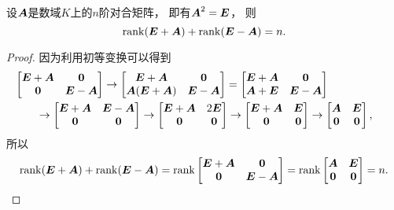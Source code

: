 \begin{example}\label{example:对合矩阵.对合矩阵的秩的性质1}
设\(\boldsymbol{A}\)是数域\(K\)上的\(n\)阶对合矩阵，
即有\(\boldsymbol{A}^2=\boldsymbol{E}\)，
则\[
	\rank(\boldsymbol{E}+\boldsymbol{A})+\rank(\boldsymbol{E}-\boldsymbol{A})=n.
\]
\begin{proof}
因为利用初等变换可以得到\begin{align*}
	&\hspace{-20pt}
	\begin{bmatrix}
		\vb{E}+\vb{A} & \vb0 \\
		\vb0 & \vb{E}-\vb{A}
	\end{bmatrix}
	\to \begin{bmatrix}
		\vb{E}+\vb{A} & \vb0 \\
		\vb{A}(\vb{E}+\vb{A}) & \vb{E}-\vb{A}
	\end{bmatrix}
	= \begin{bmatrix}
		\vb{E}+\vb{A} & \vb0 \\
		\vb{A}+\vb{E} & \vb{E}-\vb{A}
	\end{bmatrix} \\
	&\to \begin{bmatrix}
		\vb{E}+\vb{A} & \vb{E}-\vb{A} \\
		\vb0 & \vb0
	\end{bmatrix}
	\to \begin{bmatrix}
		\vb{E}+\vb{A} & 2\vb{E} \\
		\vb0 & \vb0
	\end{bmatrix}
	\to \begin{bmatrix}
		\vb{E}+\vb{A} & \vb{E} \\
		\vb0 & \vb0
	\end{bmatrix}
	\to \begin{bmatrix}
		\vb{A} & \vb{E} \\
		\vb0 & \vb0
	\end{bmatrix},
\end{align*}
所以\[
	\rank(\boldsymbol{E}+\boldsymbol{A})+\rank(\boldsymbol{E}-\boldsymbol{A})
	=\rank\begin{bmatrix}
		\boldsymbol{E}+\boldsymbol{A} & \boldsymbol0 \\
		\boldsymbol0 & \boldsymbol{E}-\boldsymbol{A}
	\end{bmatrix}
	= \rank\begin{bmatrix}
		\boldsymbol{A} & \boldsymbol{E} \\
		\boldsymbol0 & \boldsymbol0
	\end{bmatrix}
	= n.
	\qedhere
\]
\end{proof}
\end{example}

